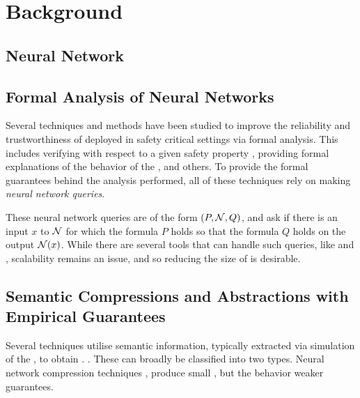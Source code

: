 \section{Background}
\subsection{Neural Network}

\subsection{ Formal Analysis of Neural Networks }

Several techniques and methods have been studied to improve the reliability and
trustworthiness of \dnn deployed in safety critical settings via formal
analysis. This includes verifying \dnn with respect to a given
safety property \cite{reluplex, cegar-nn, deeppoly, cegarette, cleverest-nn,
conv-abs-gk, deep-abstract, lin-comb-abs-jan}, providing formal explanations of
the behavior of the \dnn \cite{minimal-image-fxai, overview-fxai}, and others.
 To provide the
formal guarantees behind the analysis performed, all of these techniques rely on
making \textit{neural network queries}. 

These neural network queries are of the form $(P, \mathcal{N}, Q)$, and ask if
there is an input $x$ to $\mathcal{N}$ for which the formula $P$ holds so that
the formula $Q$ holds on the output $\mathcal{N}(x)$. While there are several
tools that can handle such queries, like \marabou and \abcrown, scalability
remains an issue, and so reducing the size of \cnc is desirable.

\subsection{Semantic Compressions and Abstractions with Empirical Guarantees}

Several techniques utilise semantic information, typically extracted via
simulation of the \dnn, to obtain \abs. .
These can broadly be classified into two types. Neural network compression
techniques , produce small \abs, but the behavior 
weaker guarantees.

